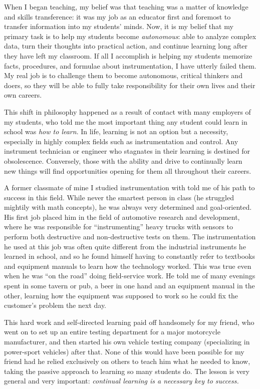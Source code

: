 When I began teaching, my belief was that teaching was a matter of knowledge and skills transference: it was my job as an educator first and foremost to transfer information into my students' minds.  Now, it is my belief that my primary task is to help my students become \textit{autonomous}: able to analyze complex data, turn their thoughts into practical action, and continue learning long after they have left my classroom.  If all I accomplish is helping my students memorize facts, procedures, and formulae about instrumentation, I have utterly failed them.  My real job is to challenge them to become autonomous, critical thinkers and doers, so they will be able to fully take responsibility for their own lives and their own careers.

This shift in philosophy happened as a result of contact with many employers of my students, who told me the most important thing any student could learn in school was \textit{how to learn}.  In life, learning is not an option but a necessity, especially in highly complex fields such as instrumentation and control.  Any instrument technician or engineer who stagnates in their learning is destined for obsolescence.  Conversely, those with the ability and drive to continually learn new things will find opportunities opening for them all throughout their careers.

\vskip 10pt

A former classmate of mine I studied instrumentation with told me of his path to success in this field.  While never the smartest person in class (he struggled mightily with math concepts), he was always very determined and goal-oriented.  His first job placed him in the field of automotive research and development, where he was responsible for ``instrumenting'' heavy trucks with sensors to perform both destructive and non-destructive tests on them.  The instrumentation he used at this job was often quite different from the industrial instruments he learned in school, and so he found himself having to constantly refer to textbooks and equipment manuals to learn how the technology worked.  This was true even when he was ``on the road'' doing field-service work.  He told me of many evenings spent in some tavern or pub, a beer in one hand and an equipment manual in the other, learning how the equipment was supposed to work so he could fix the customer's problem the next day.

This hard work and self-directed learning paid off handsomely for my friend, who went on to set up an entire testing department for a major motorcycle manufacturer, and then started his own vehicle testing company (specializing in power-sport vehicles) after that.  None of this would have been possible for my friend had he relied exclusively on others to teach him what he needed to know, taking the passive approach to learning so many students do.  The lesson is very general and very important: \textit{continual learning is a necessary key to success.}

